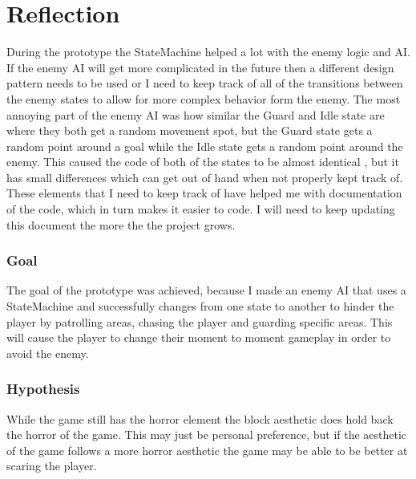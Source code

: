 \documentclass{article}
\begin{document}
\section*{Reflection}
During the prototype the StateMachine helped a lot with the enemy logic and AI. If the enemy AI will get more complicated in 
the future then a different design pattern needs to be used or I need to keep track of all of the transitions between the enemy
states to allow for more complex behavior form the enemy.
The most annoying part of the enemy AI was how similar the Guard and Idle state are where they both get a random movement spot,
but the Guard state gets a random point around a goal while the Idle state gets a random point around the enemy. This caused
the code of both of the states to be almost identical , but it has small differences which can get out of hand when not properly
kept track of.
These elements that I need to keep track of have helped me with documentation of the code, which in turn makes it easier to code.
I will need to keep updating this document the more the the project grows.

\subsubsection*{Goal}
The goal of the prototype was achieved, because I made an enemy AI that uses a StateMachine and successfully changes from one state to
another to hinder the player by patrolling areas, chasing the player and guarding specific areas. This will cause the player to change their
moment to moment gameplay in order to avoid the enemy.

\newpage
\subsubsection*{Hypothesis}
While the game still has the horror element the block aesthetic does hold back the horror of the game. This may just be personal preference, but
if the aesthetic of the game follows a more horror aesthetic the game may be able to be better at scaring the player.
\end{document}
